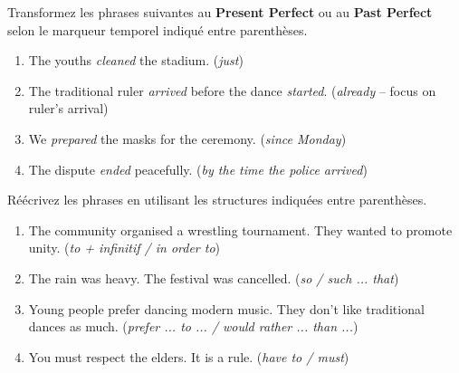 \documentclass[11pt]{article}
\begin{document}
\begin{exercice}
Transformez les phrases suivantes au \textbf{Present Perfect} ou au \textbf{Past Perfect} selon le marqueur temporel indiqué entre parenthèses.

\begin{enumerate}
\item The youths \emph{cleaned} the stadium. (\emph{just})
\item The traditional ruler \emph{arrived} before the dance \emph{started}. (\emph{already} -- focus on ruler's arrival)
\item We \emph{prepared} the masks for the ceremony. (\emph{since Monday})
\item The dispute \emph{ended} peacefully. (\emph{by the time the police arrived})
\end{enumerate}
\end{exercice}

\begin{exercice}
Réécrivez les phrases en utilisant les structures indiquées entre parenthèses.

\begin{enumerate}
\item The community organised a wrestling tournament. They wanted to promote unity. (\emph{to + infinitif / in order to})
\item The rain was heavy. The festival was cancelled. (\emph{so / such ... that})
\item Young people prefer dancing modern music. They don't like traditional dances as much. (\emph{prefer ... to ... / would rather ... than ...})
\item You must respect the elders. It is a rule. (\emph{have to / must})
\end{enumerate}
\end{exercice}
\end{document}
